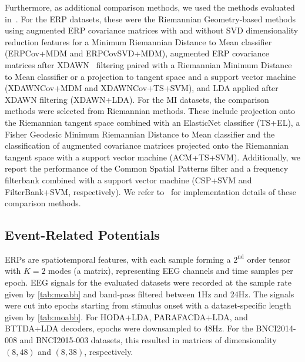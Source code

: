 \documentclass[10pt]{iopart}
\begin{document}
Furthermore, as additional comparison methods, we used the methods evaluated in~\cite{Chevallier2024}.
For the ERP datasets, these were the Riemannian Geometry-based methods
using augmented ERP covariance matrices with and without SVD dimensionality
reduction features for a Minimum Riemannian Distance to Mean classifier
(ERPCov+MDM and ERPCovSVD+MDM), augmented ERP covariance matrices after
XDAWN~\cite{Rivet2009}
filtering paired with a Riemannian Minimum Distance to Mean classifier or a
projection to tangent space and a support vector machine
(XDAWNCov+MDM and XDAWNCov+TS+SVM), and LDA applied after XDAWN filtering
(XDAWN+LDA).
For the MI datasets, the comparison methods were selected from Riemannian
methods.
These include projection onto the Riemannian tangent space combined with an
ElasticNet classifier (TS+EL), a Fisher Geodesic Minimum Riemannian Distance to
Mean classifier and the classification of augmented covariance matrices
projected onto the Riemannian tangent space with a support vector machine
(ACM+TS+SVM).
Additionally, we report the performance of the Common Spatial Patterns filter
and a frequency filterbank combined with a support vector machine (CSP+SVM and
FilterBank+SVM, respectively).
We refer to~\cite{Chevallier2024} for implementation details of these comparison
methods.

\subsection{Event-Related Potentials}
ERPs are spatiotemporal features, with each sample forming a $2^\text{nd}$
order tensor with $K=2$ modes (a matrix), representing EEG channels and time samples
per epoch.
EEG signals for the evaluated datasets were recorded at the sample rate given
by \cref{tab:moabb} and band-pass filtered between 1Hz
and 24Hz.
The signals were cut into epochs starting from stimulus onset with a
dataset-specific length given by \cref{tab:moabb}.
For HODA+LDA, PARAFACDA+LDA, and BTTDA+LDA decoders, epochs were downsampled to 48Hz.
For the BNCI2014-008 and BNCI2015-003 datasets, this resulted in matrices of
dimensionality $(8,48)$ and $(8,38)$, respectively.
\end{document}
